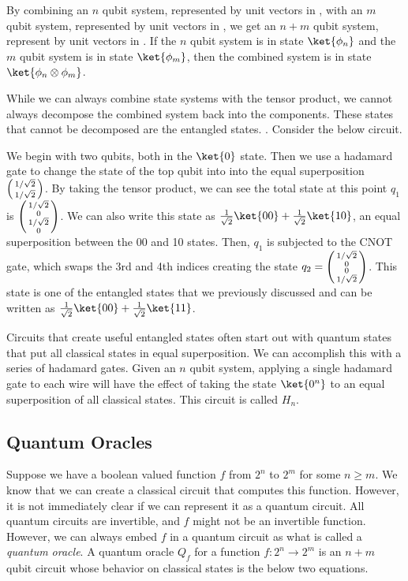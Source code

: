 By combining an $n$ qubit system, represented by unit vectors in , with an $m$ qubit system, represented by unit vectors in , we get an $n + m$ qubit system, represent by unit vectors in .
If the $n$ qubit system is in state $\ket{\phi_n}$ and the $m$ qubit system is in state $\ket{\phi_m}$, then the combined system is in state $\ket{\phi_n \otimes \phi_m}$.

While we can always combine state systems with the tensor product, we cannot always decompose the combined system back into the components.
These states that cannot be decomposed are the entangled states. . Consider the below circuit.



We begin with two qubits, both in the $\ket{0}$ state.
Then we use a hadamard gate to change the state of the top qubit into into the equal superposition $\left(\begin{smallmatrix}1/\sqrt{2} \\ 1/\sqrt{2}\end{smallmatrix}\right)$.
By taking the tensor product, we can see the total state at this point $q_1$ is $\left(\begin{smallmatrix}1/\sqrt{2} \\ 0 \\ 1/\sqrt{2} \\ 0\end{smallmatrix}\right)$.
We can also write this state as $\frac{1}{\sqrt{2}}\ket{00} + \frac{1}{\sqrt{2}}\ket{10}$, an equal superposition between the 00 and 10 states.
Then, $q_1$ is subjected to the CNOT gate, which swaps the 3rd and 4th indices creating the state $q_2 = \left(\begin{smallmatrix}1/\sqrt{2} \\ 0 \\ 0 \\ 1/\sqrt{2}\end{smallmatrix}\right)$.
This state is one of the entangled states that we previously discussed and can be written as  $\frac{1}{\sqrt{2}}\ket{00} + \frac{1}{\sqrt{2}}\ket{11}$.

Circuits that create useful entangled states often start out with quantum states that put all classical states in equal superposition.
We can accomplish this with a series of hadamard gates.
Given an $n$ qubit system, applying a single hadamard gate to each wire will have the effect of taking the state $\ket{0^n}$ to an equal superposition of all classical states.
This circuit is called $H_n$.

\subsection{Quantum Oracles}

Suppose we have a boolean valued function $f$ from $2^n$ to $2^m$ for some $n \geq m$.
We know that we can create a classical circuit that computes this function.
However, it is not immediately clear if we can represent it as a quantum circuit.
All quantum circuits are invertible, and $f$ might not be an invertible function.
However, we can always embed $f$ in a quantum circuit as what is called a \emph{quantum oracle}.
A quantum oracle $Q_f$ for a function $f: 2^n \rightarrow 2^m$ is an $n + m$ qubit circuit whose behavior on classical states is the below two equations.

